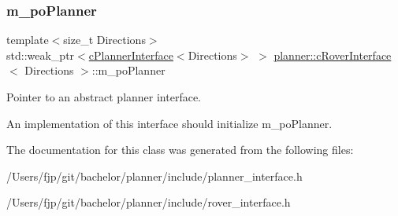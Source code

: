 \subsubsection{\texorpdfstring{m\+\_\+po\+Planner}{m\_poPlanner}}
{\footnotesize\ttfamily template$<$size\+\_\+t Directions$>$ \\
std\+::weak\+\_\+ptr$<$\mbox{\hyperlink{classplanner_1_1c_planner_interface}{c\+Planner\+Interface}}$<$Directions$>$ $>$ \mbox{\hyperlink{classplanner_1_1c_rover_interface}{planner\+::c\+Rover\+Interface}}$<$ Directions $>$\+::m\+\_\+po\+Planner\hspace{0.3cm}{\ttfamily [protected]}}



Pointer to an abstract planner interface. 

An implementation of this interface should initialize m\+\_\+po\+Planner. 

The documentation for this class was generated from the following files\+:\begin{DoxyCompactItemize}
\item 
/\+Users/fjp/git/bachelor/planner/include/planner\+\_\+interface.\+h\item 
/\+Users/fjp/git/bachelor/planner/include/rover\+\_\+interface.\+h\end{DoxyCompactItemize}
